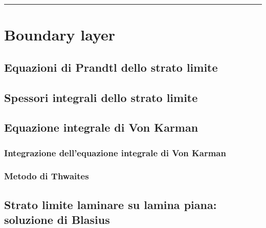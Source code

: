 \documentclass[letterpaper,10pt,italian]{jupyterBook}
\begin{document}
\bigskip\hrule\bigskip


\sphinxstepscope


\chapter{Boundary layer}
\label{\detokenize{polimi/fluidmechanics-ita/template/capitoli/09_bl/09teoria:boundary-layer}}\label{\detokenize{polimi/fluidmechanics-ita/template/capitoli/09_bl/09teoria:fluid-mechanics-bl}}\label{\detokenize{polimi/fluidmechanics-ita/template/capitoli/09_bl/09teoria::doc}}

\section{Equazioni di Prandtl dello strato limite}
\label{\detokenize{polimi/fluidmechanics-ita/template/capitoli/09_bl/09teoria:equazioni-di-prandtl-dello-strato-limite}}

\section{Spessori integrali dello strato limite}
\label{\detokenize{polimi/fluidmechanics-ita/template/capitoli/09_bl/09teoria:spessori-integrali-dello-strato-limite}}

\section{Equazione integrale di Von Karman}
\label{\detokenize{polimi/fluidmechanics-ita/template/capitoli/09_bl/09teoria:equazione-integrale-di-von-karman}}

\subsection{Integrazione dell’equazione integrale di Von Karman}
\label{\detokenize{polimi/fluidmechanics-ita/template/capitoli/09_bl/09teoria:integrazione-dell-equazione-integrale-di-von-karman}}

\subsection{Metodo di Thwaites}
\label{\detokenize{polimi/fluidmechanics-ita/template/capitoli/09_bl/09teoria:metodo-di-thwaites}}

\section{Strato limite laminare su lamina piana: soluzione di Blasius}
\label{\detokenize{polimi/fluidmechanics-ita/template/capitoli/09_bl/09teoria:strato-limite-laminare-su-lamina-piana-soluzione-di-blasius}}
\sphinxstepscope
\end{document}
